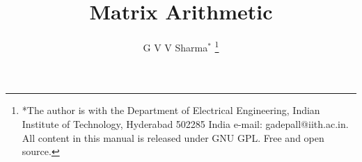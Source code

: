 \documentclass[journal,12pt,twocolumn]{IEEEtran}
\begin{document}
\let\StandardTheFigure\thefigure
\let\vec\mathbf
\renewcommand{\thefigure}{\theproblem}



\def\putbox#1#2#3{\makebox[0in][l]{\makebox[#1][l]{}\raisebox{\baselineskip}[0in][0in]{\raisebox{#2}[0in][0in]{#3}}}}
     \def\rightbox#1{\makebox[0in][r]{#1}}
     \def\centbox#1{\makebox[0in]{#1}}
     \def\topbox#1{\raisebox{-\baselineskip}[0in][0in]{#1}}
     \def\midbox#1{\raisebox{-0.5\baselineskip}[0in][0in]{#1}}

\vspace{3cm}

\title{
Matrix Arithmetic
}
\author{ G V V Sharma$^{*}$%
	\thanks{*The author is with the Department
		of Electrical Engineering, Indian Institute of Technology, Hyderabad
		502285 India e-mail:  gadepall@iith.ac.in. All content in this manual is released under GNU GPL.  Free and open source.}
	
}	


%
%
%

% 
%
\end{document}
